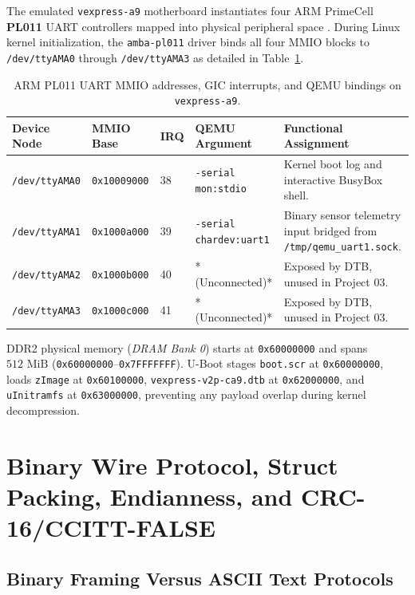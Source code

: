 \documentclass[11pt,a4paper,oneside]{report}
\begin{document}
The emulated \texttt{vexpress-a9} motherboard instantiates four ARM PrimeCell \textbf{PL011} UART controllers mapped into physical peripheral space \cite{qemu_vexpress}. During Linux kernel initialization, the \texttt{amba-pl011} driver binds all four MMIO blocks to \texttt{/dev/ttyAMA0} through \texttt{/dev/ttyAMA3} as detailed in Table~\ref{tab:ch1_pl011}.

\begin{table}[!htbp]
\centering
\caption{ARM PL011 UART MMIO addresses, GIC interrupts, and QEMU bindings on \texttt{vexpress-a9}.}
\label{tab:ch1_pl011}
\begin{tabularx}{\linewidth}{l l l l X}
\toprule
\textbf{Device Node} & \textbf{MMIO Base} & \textbf{IRQ} & \textbf{QEMU Argument} & \textbf{Functional Assignment} \\
\midrule
\texttt{/dev/ttyAMA0} & \texttt{0x10009000} & 38 & \texttt{-serial mon:stdio} & Kernel boot log and interactive BusyBox shell. \\
\texttt{/dev/ttyAMA1} & \texttt{0x1000a000} & 39 & \texttt{-serial chardev:uart1} & Binary sensor telemetry input bridged from \texttt{/tmp/qemu\_uart1.sock}. \\
\texttt{/dev/ttyAMA2} & \texttt{0x1000b000} & 40 & *(Unconnected)* & Exposed by DTB, unused in Project 03. \\
\texttt{/dev/ttyAMA3} & \texttt{0x1000c000} & 41 & *(Unconnected)* & Exposed by DTB, unused in Project 03. \\
\bottomrule
\end{tabularx}
\end{table}

DDR2 physical memory (\emph{DRAM Bank 0}) starts at \texttt{0x60000000} and spans $512\text{ MiB}$ (\texttt{0x60000000}--\texttt{0x7FFFFFFF}). U-Boot stages \texttt{boot.scr} at \texttt{0x60000000}, loads \texttt{zImage} at \texttt{0x60100000}, \texttt{vexpress-v2p-ca9.dtb} at \texttt{0x62000000}, and \texttt{uInitramfs} at \texttt{0x63000000}, preventing any payload overlap during kernel decompression.


\chapter{Binary Wire Protocol, Struct Packing, Endianness, and CRC-16/CCITT-FALSE}

\section{Binary Framing Versus ASCII Text Protocols}
\end{document}
